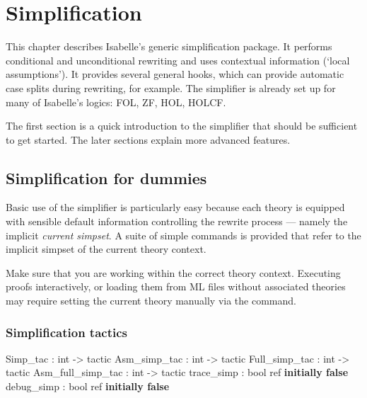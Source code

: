 \chapter{Simplification}
\label{chap:simplification}

This chapter describes Isabelle's generic simplification package.  It performs
conditional and unconditional rewriting and uses contextual information
(`local assumptions').  It provides several general hooks, which can provide
automatic case splits during rewriting, for example.  The simplifier is
already set up for many of Isabelle's logics: FOL, ZF, HOL, HOLCF.

The first section is a quick introduction to the simplifier that
should be sufficient to get started.  The later sections explain more
advanced features.


\section{Simplification for dummies}
\label{sec:simp-for-dummies}

Basic use of the simplifier is particularly easy because each theory
is equipped with sensible default information controlling the rewrite
process --- namely the implicit {\em current
  simpset}.  A suite of simple commands is
provided that refer to the implicit simpset of the current theory
context.

\begin{warn}
  Make sure that you are working within the correct theory context.
  Executing proofs interactively, or loading them from ML files
  without associated theories may require setting the current theory
  manually via the  command.
\end{warn}

\subsection{Simplification tactics} \label{sec:simp-for-dummies-tacs}
\begin{ttbox}
Simp_tac          : int -> tactic
Asm_simp_tac      : int -> tactic
Full_simp_tac     : int -> tactic
Asm_full_simp_tac : int -> tactic
trace_simp        : bool ref \hfill{\bf initially false}
debug_simp        : bool ref \hfill{\bf initially false}
\end{ttbox}

